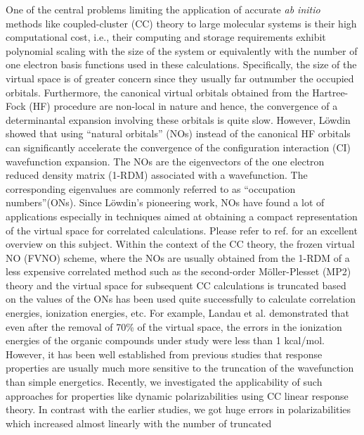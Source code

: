 One of the central problems limiting the application of accurate {\em ab
initio} methods like coupled-cluster (CC) theory to large molecular systems is 
their high computational cost, i.e., their computing and storage requirements 
exhibit polynomial scaling with the size of the system or equivalently
with the number of one electron basis functions used in these calculations. 
Specifically, the size of the virtual space is of greater concern since they 
usually far outnumber the occupied orbitals. Furthermore, the canonical virtual 
orbitals obtained from the Hartree-Fock (HF) procedure are non-local in nature 
and hence, the convergence of a determinantal expansion involving these orbitals
is quite slow. However, L{\"o}wdin \cite{Lowdin55}showed that using 
``natural orbitals'' (NOs) instead of the canonical HF orbitals can significantly accelerate the convergence of the configuration interaction (CI) wavefunction expansion. The NOs are the eigenvectors of the one electron reduced density matrix (1-RDM) associated with a wavefunction. The corresponding eigenvalues are commonly referred to as ``occupation numbers''(ONs). Since L{\"o}wdin's pioneering work, NOs have found a lot of applications especially in techniques aimed at obtaining a compact representation of the virtual space for correlated calculations\cite{DePrince13,DePrince13:FNOs,Landau10,Sosa89,Taube05,Taube08}.
Please refer to ref.\cite{Landau10} for an excellent overview on this subject. 
Within the context of the CC theory, the frozen virtual NO (FVNO) scheme, where 
the NOs are usually obtained from the 1-RDM of a less expensive correlated method such as the second-order M{\"o}ller-Plesset (MP2) theory and the virtual space for subsequent CC calculations is truncated based on the values of the ONs has been used quite successfully to calculate correlation energies, ionization 
energies, etc. For example, Landau et al.\cite{Landau10} demonstrated 
that even after the removal of 70\% of the virtual space, the errors in
the ionization energies of the organic compounds under study were less than 1 kcal/mol. However, it has been well established from previous studies that response properties are usually much more sensitive to the truncation of the wavefunction than simple  energetics\cite{Korona04,Russ04,Russ08,McAlexander12,Friedrich15,McAlexander15:LRCC}. Recently, we investigated the applicability of such approaches for properties like dynamic polarizabilities using CC linear response theory\cite{Koch90}. 
In contrast with the earlier studies\cite{Kumar17}, we got huge errors in 
polarizabilities which increased almost linearly with the number of truncated 
